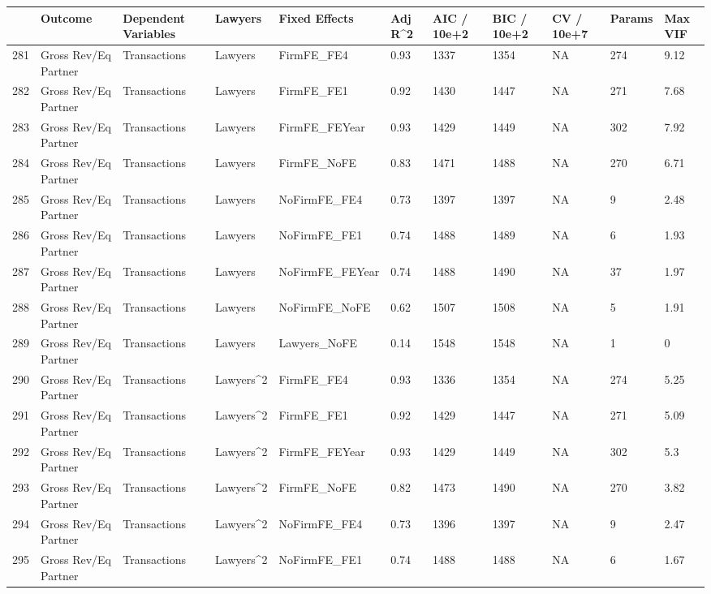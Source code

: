 \begin{table}[ht]
\centering
\begin{tabular}{rllllllllll}
  \hline
 & Outcome & Dependent Variables & Lawyers & Fixed Effects & Adj R^2 & AIC / 10e+2 & BIC / 10e+2 & CV / 10e+7 & Params & Max VIF \\ 
  \hline
281 & Gross Rev/Eq Partner & Transactions & Lawyers & FirmFE\_FE4 & 0.93 & 1337 & 1354 & NA & 274 & 9.12 \\ 
  282 & Gross Rev/Eq Partner & Transactions & Lawyers & FirmFE\_FE1 & 0.92 & 1430 & 1447 & NA & 271 & 7.68 \\ 
  283 & Gross Rev/Eq Partner & Transactions & Lawyers & FirmFE\_FEYear & 0.93 & 1429 & 1449 & NA & 302 & 7.92 \\ 
  284 & Gross Rev/Eq Partner & Transactions & Lawyers & FirmFE\_NoFE & 0.83 & 1471 & 1488 & NA & 270 & 6.71 \\ 
  285 & Gross Rev/Eq Partner & Transactions & Lawyers & NoFirmFE\_FE4 & 0.73 & 1397 & 1397 & NA & 9 & 2.48 \\ 
  286 & Gross Rev/Eq Partner & Transactions & Lawyers & NoFirmFE\_FE1 & 0.74 & 1488 & 1489 & NA & 6 & 1.93 \\ 
  287 & Gross Rev/Eq Partner & Transactions & Lawyers & NoFirmFE\_FEYear & 0.74 & 1488 & 1490 & NA & 37 & 1.97 \\ 
  288 & Gross Rev/Eq Partner & Transactions & Lawyers & NoFirmFE\_NoFE & 0.62 & 1507 & 1508 & NA & 5 & 1.91 \\ 
  289 & Gross Rev/Eq Partner & Transactions & Lawyers & Lawyers\_NoFE & 0.14 & 1548 & 1548 & NA & 1 & 0 \\ 
  290 & Gross Rev/Eq Partner & Transactions & Lawyers^2 & FirmFE\_FE4 & 0.93 & 1336 & 1354 & NA & 274 & 5.25 \\ 
  291 & Gross Rev/Eq Partner & Transactions & Lawyers^2 & FirmFE\_FE1 & 0.92 & 1429 & 1447 & NA & 271 & 5.09 \\ 
  292 & Gross Rev/Eq Partner & Transactions & Lawyers^2 & FirmFE\_FEYear & 0.93 & 1429 & 1449 & NA & 302 & 5.3 \\ 
  293 & Gross Rev/Eq Partner & Transactions & Lawyers^2 & FirmFE\_NoFE & 0.82 & 1473 & 1490 & NA & 270 & 3.82 \\ 
  294 & Gross Rev/Eq Partner & Transactions & Lawyers^2 & NoFirmFE\_FE4 & 0.73 & 1396 & 1397 & NA & 9 & 2.47 \\ 
  295 & Gross Rev/Eq Partner & Transactions & Lawyers^2 & NoFirmFE\_FE1 & 0.74 & 1488 & 1488 & NA & 6 & 1.67 \\ 

\end{tabular}
\end{table}

